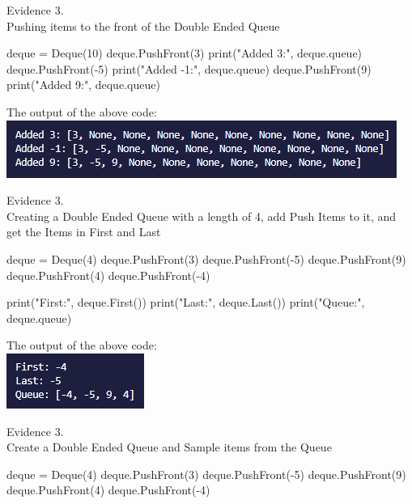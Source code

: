 \begin{center}
    {\large Evidence 3.\rn } \\ 
    \vspace{0.3cm}
    Pushing items to the front of the Double Ended Queue \\

    \begin{pythoncode}
deque = Deque(10)
deque.PushFront(3)
print("Added 3:", deque.queue)
deque.PushFront(-5)
print("Added -1:", deque.queue)
deque.PushFront(9)
print("Added 9:", deque.queue)
    \end{pythoncode}
    
    The output of the above code: \\
    \includegraphics{Images/Testing/T3.8.1.PNG}
    \vspace{1cm}

    {\large Evidence 3.\rn } \\ 
    \vspace{0.3cm}
    Creating a Double Ended Queue with a length of 4, add Push Items to it, and get the 
    Items in First and Last \\

    \begin{pythoncode}
deque = Deque(4)
deque.PushFront(3)
deque.PushFront(-5)
deque.PushFront(9)
deque.PushFront(4)
deque.PushFront(-4)

print("First:", deque.First())
print("Last:", deque.Last())
print("Queue:", deque.queue)
    \end{pythoncode}

    The output of the above code: \\
    \includegraphics{Images/Testing/T3.9.1.PNG}
    \vspace{1cm}

    {\large Evidence 3.\rn } \\ 
    \vspace{0.3cm}
    Create a Double Ended Queue and Sample items from the Queue \\

    \begin{pythoncode}
deque = Deque(4)
deque.PushFront(3)
deque.PushFront(-5)
deque.PushFront(9)
deque.PushFront(4)
deque.PushFront(-4)


\end{pythoncode}
\end{center}
